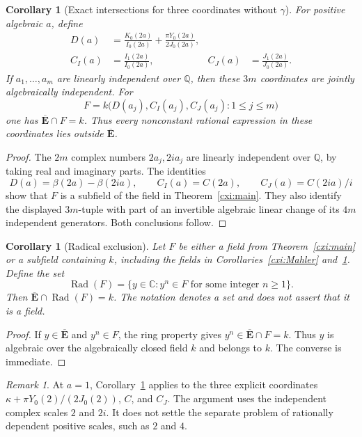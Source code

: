 \documentclass[11pt]{article}
\newtheorem{corollary}[theorem]{Corollary}
\theoremstyle{definition}
\theoremstyle{remark}
\newtheorem{remark}[theorem]{Remark}
\newcommand{\Ebar}{\overline{\mathbf E}}
\begin{document}
\begin{corollary}[Exact intersections for three coordinates without $\gamma$]
\label{cxi:gammafree}
For positive algebraic $a$, define
\begin{align*}
 D(a)&=\frac{K_0(2a)}{I_0(2a)}
             +\frac{\pi Y_0(2a)}{2J_0(2a)},\\
 C_I(a)&=\frac{I_1(2a)}{I_0(2a)},&
 C_J(a)&=\frac{J_1(2a)}{J_0(2a)}.
\end{align*}
If $a_1,\ldots,a_m$ are linearly independent over $\mathbb Q$, then
these $3m$ coordinates are jointly algebraically independent.  For
\[
 F=k\bigl(D(a_j),C_I(a_j),C_J(a_j):1\le j\le m\bigr)
\]
one has $\Ebar\cap F=k$.  Thus every nonconstant rational expression
in these coordinates lies outside $\Ebar$.
\end{corollary}
\begin{proof}
The $2m$ complex numbers $2a_j,2ia_j$ are linearly independent over
$\mathbb Q$, by taking real and imaginary parts.  The identities
\[
 D(a)=\beta(2a)-\beta(2ia),\qquad
 C_I(a)=C(2a),\qquad C_J(a)=C(2ia)/i
\]
show that $F$ is a subfield of the field in
Theorem~\ref{cxi:main}.  They also identify the displayed $3m$-tuple
with part of an invertible algebraic linear change of its $4m$
independent generators.  Both conclusions follow.
\end{proof}

\begin{corollary}[Radical exclusion]
\label{cxi:radicals}
Let $F$ be either a field from Theorem~\ref{cxi:main} or a subfield
containing $k$, including the fields in Corollaries~\ref{cxi:Mahler}
and~\ref{cxi:gammafree}.  Define the set
\[
 \operatorname{Rad}(F)=
 \{y\in\mathbb C:y^n\in F\text{ for some integer }n\ge1\}.
\]
Then $\Ebar\cap\operatorname{Rad}(F)=k$.
The notation denotes a set and does not assert that it is a field.
\end{corollary}
\begin{proof}
If $y\in\Ebar$ and $y^n\in F$, the ring property gives
$y^n\in\Ebar\cap F=k$.  Thus $y$ is algebraic over the algebraically
closed field $k$ and belongs to $k$.  The converse is immediate.
\end{proof}

\begin{remark}
At $a=1$, Corollary~\ref{cxi:gammafree} applies to the three explicit
coordinates $\kappa+\pi Y_0(2)/(2J_0(2))$, $C$, and $C_J$.
The argument uses the independent complex scales $2$ and $2i$.
It does not settle the separate problem of rationally dependent
positive scales, such as $2$ and $4$.
\end{remark}
\end{document}
